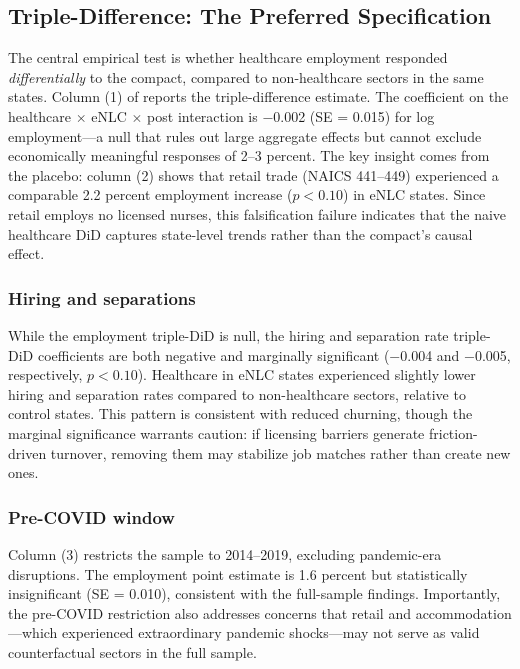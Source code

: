 \documentclass[12pt]{article}
\begin{document}
\subsection{Triple-Difference: The Preferred Specification}



The central empirical test is whether healthcare employment responded \emph{differentially} to the compact, compared to non-healthcare sectors in the same states. Column (1) of  reports the triple-difference estimate. The coefficient on the healthcare $\times$ eNLC $\times$ post interaction is $-$0.002 (SE = 0.015) for log employment---a null that rules out large aggregate effects but cannot exclude economically meaningful responses of 2--3 percent. The key insight comes from the placebo: column (2) shows that retail trade (NAICS 441--449) experienced a comparable 2.2 percent employment increase ($p < 0.10$) in eNLC states. Since retail employs no licensed nurses, this falsification failure indicates that the naive healthcare DiD captures state-level trends rather than the compact's causal effect.

\subsubsection*{Hiring and separations} While the employment triple-DiD is null, the hiring and separation rate triple-DiD coefficients are both negative and marginally significant ($-$0.004 and $-$0.005, respectively, $p < 0.10$). Healthcare in eNLC states experienced slightly lower hiring and separation rates compared to non-healthcare sectors, relative to control states. This pattern is consistent with reduced churning, though the marginal significance warrants caution: if licensing barriers generate friction-driven turnover, removing them may stabilize job matches rather than create new ones.

\subsubsection*{Pre-COVID window} Column (3) restricts the sample to 2014--2019, excluding pandemic-era disruptions. The employment point estimate is 1.6 percent but statistically insignificant (SE = 0.010), consistent with the full-sample findings. Importantly, the pre-COVID restriction also addresses concerns that retail and accommodation---which experienced extraordinary pandemic shocks---may not serve as valid counterfactual sectors in the full sample.
\end{document}
